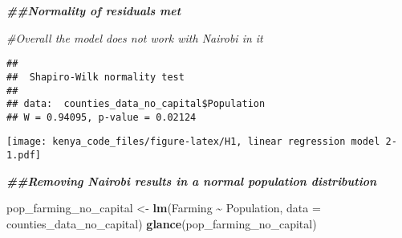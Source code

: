 \documentclass[
]{article}
\newenvironment{Shaded}{\begin{snugshade}}{\end{snugshade}}
\newcommand{\AttributeTok}[1]{\textcolor[rgb]{0.13,0.29,0.53}{#1}}
\newcommand{\CommentTok}[1]{\textcolor[rgb]{0.56,0.35,0.01}{\textit{#1}}}
\newcommand{\DocumentationTok}[1]{\textcolor[rgb]{0.56,0.35,0.01}{\textbf{\textit{#1}}}}
\newcommand{\FunctionTok}[1]{\textcolor[rgb]{0.13,0.29,0.53}{\textbf{#1}}}
\newcommand{\NormalTok}[1]{#1}
\newcommand{\OtherTok}[1]{\textcolor[rgb]{0.56,0.35,0.01}{#1}}
\newcommand{\SpecialCharTok}[1]{\textcolor[rgb]{0.81,0.36,0.00}{\textbf{#1}}}
\newcommand{\StringTok}[1]{\textcolor[rgb]{0.31,0.60,0.02}{#1}}
\begin{document}
\begin{Shaded}
\begin{Highlighting}[]
\DocumentationTok{\#\#Normality of residuals met}

\CommentTok{\#Overall the model does not work with Nairobi in it}
\end{Highlighting}
\end{Shaded}

\begin{Shaded}
\end{Shaded}

\begin{verbatim}
## 
##  Shapiro-Wilk normality test
## 
## data:  counties_data_no_capital$Population
## W = 0.94095, p-value = 0.02124
\end{verbatim}

\begin{Shaded}
\end{Shaded}

\texttt{[image: kenya\_code\_files/figure-latex/H1, linear regression model 2-1.pdf]}

\begin{Shaded}
\begin{Highlighting}[]
\DocumentationTok{\#\#Removing Nairobi results in a normal population distribution}

\NormalTok{pop\_farming\_no\_capital }\OtherTok{\textless{}{-}} \FunctionTok{lm}\NormalTok{(Farming }\SpecialCharTok{\textasciitilde{}}\NormalTok{ Population, }\AttributeTok{data =}\NormalTok{ counties\_data\_no\_capital)}
\FunctionTok{glance}\NormalTok{(pop\_farming\_no\_capital)}
\end{Highlighting}
\end{Shaded}
\end{document}

